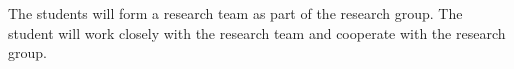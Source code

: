 The students will form a research team as part of the research group.
The student will work closely with the research team and cooperate with the research group.











